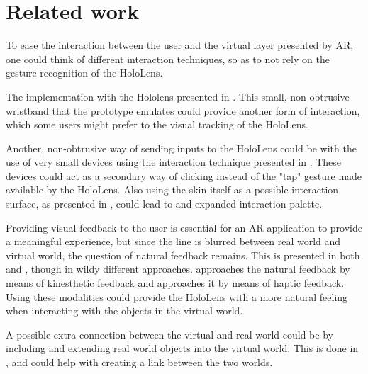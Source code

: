 
\section{Related work}
To ease the interaction between the user and the virtual layer presented by AR, one could think of different interaction techniques, so as to not rely on the gesture recognition of the HoloLens.\par
The implementation with the Hololens presented in \cite{watchsense}. This small, non obtrusive wristband that the prototype emulates could provide another form of interaction, which some users might prefer to the visual tracking of the HoloLens.\par
Another, non-obtrusive way of sending inputs to the HoloLens could be with the use of very small devices using the interaction technique presented in \cite{back}. These devices could act as a secondary way of clicking instead of the "tap" gesture made available by the HoloLens. Also using the skin itself as a possible interaction surface, as presented in \cite{skin}, could lead to and expanded interaction palette.\par
Providing visual feedback to the user is essential for an AR application to  provide a meaningful experience, but since the line is blurred between real world and virtual world, the question of natural feedback remains. This is presented in both \cite{stroem} and \cite{finger}, though in wildy different approaches. \cite{stroem} approaches the natural feedback by means of kinesthetic feedback and \cite{finger} approaches it by means of haptic feedback. Using these modalities could provide the HoloLens with a more natural feeling when interacting with the objects in the virtual world.\par
A possible extra connection between the virtual and real world could be by including and extending real world objects into the virtual world. This is done in \cite{multifi}, and could help with creating a link between the two worlds. 